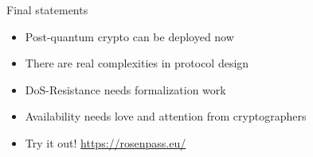 \begin{frame}{Final statements}
  \begin{itemize}
	\item Post-quantum crypto can be deployed now
	\item There are real complexities in protocol design
	\item DoS-Resistance needs formalization work
	\item Availability needs love and attention from cryptographers
	\item Try it out! \url{https://rosenpass.eu/}
  \end{itemize}
\end{frame}

